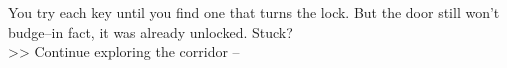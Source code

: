 You try each key until you find one that turns the lock. But the door still won’t budge--in fact, it was already unlocked. Stuck?\\

>> Continue exploring the corridor -- 